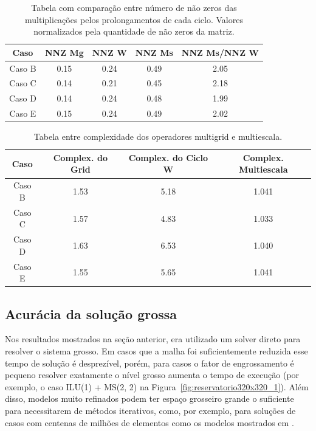 \begin{table}[]
\centering
\caption{Tabela com comparação entre número de não zeros das multiplicações pelos prolongamentos de cada ciclo. Valores normalizados pela quantidade de não zeros da matriz.} \label{tab:comparacaoMsxMgProlongamento}
\begin{tabular}{|c|c|c|c|c|}
\hline
\textbf{Caso} & \textbf{NNZ Mg} & \textbf{NNZ W} & \textbf{NNZ Ms} & \textbf{NNZ Ms/NNZ W} \\ \hline
Caso B & 0.15 & 0.24 & 0.49 & 2.05 \\ \hline
Caso C & 0.14 & 0.21 & 0.45 & 2.18 \\ \hline
Caso D & 0.14 & 0.24 & 0.48 & 1.99 \\ \hline
Caso E & 0.15 & 0.24 & 0.49 & 2.02 \\ \hline
\end{tabular}
\end{table}




\begin{table}[]
\centering
\caption{Tabela entre complexidade dos operadores multigrid e multiescala.} \label{tab:comparacaoMsxMgComplexidade}
\begin{tabular}{|c|c|c|c|}
\hline
\textbf{Caso} & \textbf{Complex. do Grid} & \textbf{Complex. do Ciclo W} & \textbf{Complex. Multiescala} \\ \hline
Caso B        & 1.53                          & 5.18                           & 1.041                             \\ \hline
Caso C        & 1.57                          & 4.83                           & 1.033                             \\ \hline
Caso D        & 1.63                          & 6.53                           & 1.040                             \\ \hline
Caso E        & 1.55                          & 5.65                           & 1.041                             \\ \hline
\end{tabular}
\end{table}

\FloatBarrier

\subsection{Acurácia da solução grossa}

Nos resultados mostrados na seção anterior, era utilizado um solver direto para resolver o sistema grosso. Em casos que a malha foi suficientemente reduzida esse tempo de solução é desprezível, porém, para casos o fator de engrossamento é pequeno resolver exatamente o nível grosso aumenta o tempo de execução (por exemplo, o caso ILU(1) + MS(2, 2) na Figura~\ref{fig:reservatorio320x320_1}). Além disso, modelos muito refinados podem ter espaço grosseiro grande o suficiente para necessitarem de  métodos iterativos, como, por exemplo, para soluções de casos com centenas de milhões de elementos como os modelos mostrados em \cite{geomecrio}.

